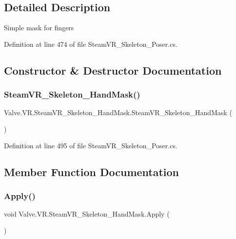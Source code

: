 \subsection{Detailed Description}
Simple mask for fingers 



Definition at line 474 of file Steam\+V\+R\+\_\+\+Skeleton\+\_\+\+Poser.\+cs.



\subsection{Constructor \& Destructor Documentation}
\mbox{\label{class_valve_1_1_v_r_1_1_steam_v_r___skeleton___hand_mask_a5a2dd2ef2430ef55701b522adc789bd4}} 
\subsubsection{\texorpdfstring{SteamVR\_Skeleton\_HandMask()}{SteamVR\_Skeleton\_HandMask()}}
{\footnotesize\ttfamily Valve.\+V\+R.\+Steam\+V\+R\+\_\+\+Skeleton\+\_\+\+Hand\+Mask.\+Steam\+V\+R\+\_\+\+Skeleton\+\_\+\+Hand\+Mask (\begin{DoxyParamCaption}{ }\end{DoxyParamCaption})}



Definition at line 495 of file Steam\+V\+R\+\_\+\+Skeleton\+\_\+\+Poser.\+cs.



\subsection{Member Function Documentation}
\mbox{\label{class_valve_1_1_v_r_1_1_steam_v_r___skeleton___hand_mask_a6729c2bbc27a22e51db3c407c7c3c228}} 
\subsubsection{\texorpdfstring{Apply()}{Apply()}}
{\footnotesize\ttfamily void Valve.\+V\+R.\+Steam\+V\+R\+\_\+\+Skeleton\+\_\+\+Hand\+Mask.\+Apply (\begin{DoxyParamCaption}{ }\end{DoxyParamCaption})\hspace{0.3cm}{\ttfamily [protected]}}



